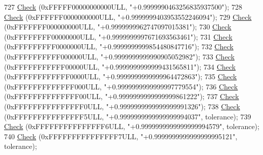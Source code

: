 \begin{DoxyCode}
727   \hyperlink{classns3_1_1int64x64_1_1test_1_1Int64x64Bug1786TestCase_aa4b4b833335ea1266a4f7f5f0e314b5b}{Check} (0xFFFFF00000000000ULL, \textcolor{stringliteral}{"+0.9999990463256835937500"});
728   \hyperlink{classns3_1_1int64x64_1_1test_1_1Int64x64Bug1786TestCase_aa4b4b833335ea1266a4f7f5f0e314b5b}{Check} (0xFFFFFF0000000000ULL, \textcolor{stringliteral}{"+0.9999999403953552246094"});
729   \hyperlink{classns3_1_1int64x64_1_1test_1_1Int64x64Bug1786TestCase_aa4b4b833335ea1266a4f7f5f0e314b5b}{Check} (0xFFFFFFF000000000ULL, \textcolor{stringliteral}{"+0.9999999962747097015381"});
730   \hyperlink{classns3_1_1int64x64_1_1test_1_1Int64x64Bug1786TestCase_aa4b4b833335ea1266a4f7f5f0e314b5b}{Check} (0xFFFFFFFF00000000ULL, \textcolor{stringliteral}{"+0.9999999997671693563461"});
731   \hyperlink{classns3_1_1int64x64_1_1test_1_1Int64x64Bug1786TestCase_aa4b4b833335ea1266a4f7f5f0e314b5b}{Check} (0xFFFFFFFFF0000000ULL, \textcolor{stringliteral}{"+0.9999999999854480847716"});
732   \hyperlink{classns3_1_1int64x64_1_1test_1_1Int64x64Bug1786TestCase_aa4b4b833335ea1266a4f7f5f0e314b5b}{Check} (0xFFFFFFFFFF000000ULL, \textcolor{stringliteral}{"+0.9999999999990905052982"});
733   \hyperlink{classns3_1_1int64x64_1_1test_1_1Int64x64Bug1786TestCase_aa4b4b833335ea1266a4f7f5f0e314b5b}{Check} (0xFFFFFFFFFFF00000ULL, \textcolor{stringliteral}{"+0.9999999999999431565811"});
734   \hyperlink{classns3_1_1int64x64_1_1test_1_1Int64x64Bug1786TestCase_aa4b4b833335ea1266a4f7f5f0e314b5b}{Check} (0xFFFFFFFFFFFF0000ULL, \textcolor{stringliteral}{"+0.9999999999999964472863"});
735   \hyperlink{classns3_1_1int64x64_1_1test_1_1Int64x64Bug1786TestCase_aa4b4b833335ea1266a4f7f5f0e314b5b}{Check} (0xFFFFFFFFFFFFF000ULL, \textcolor{stringliteral}{"+0.9999999999999997779554"});
736   \hyperlink{classns3_1_1int64x64_1_1test_1_1Int64x64Bug1786TestCase_aa4b4b833335ea1266a4f7f5f0e314b5b}{Check} (0xFFFFFFFFFFFFFF00ULL, \textcolor{stringliteral}{"+0.9999999999999999861222"});
737   \hyperlink{classns3_1_1int64x64_1_1test_1_1Int64x64Bug1786TestCase_aa4b4b833335ea1266a4f7f5f0e314b5b}{Check} (0xFFFFFFFFFFFFFFF0ULL, \textcolor{stringliteral}{"+0.9999999999999999991326"});
738   \hyperlink{classns3_1_1int64x64_1_1test_1_1Int64x64Bug1786TestCase_aa4b4b833335ea1266a4f7f5f0e314b5b}{Check} (0xFFFFFFFFFFFFFFF5ULL, \textcolor{stringliteral}{"+0.9999999999999999994037"}, tolerance);
739   \hyperlink{classns3_1_1int64x64_1_1test_1_1Int64x64Bug1786TestCase_aa4b4b833335ea1266a4f7f5f0e314b5b}{Check} (0xFFFFFFFFFFFFFFF6ULL, \textcolor{stringliteral}{"+0.9999999999999999994579"}, tolerance);
740   \hyperlink{classns3_1_1int64x64_1_1test_1_1Int64x64Bug1786TestCase_aa4b4b833335ea1266a4f7f5f0e314b5b}{Check} (0xFFFFFFFFFFFFFFF7ULL, \textcolor{stringliteral}{"+0.9999999999999999995121"}, tolerance);

\end{DoxyCode}
